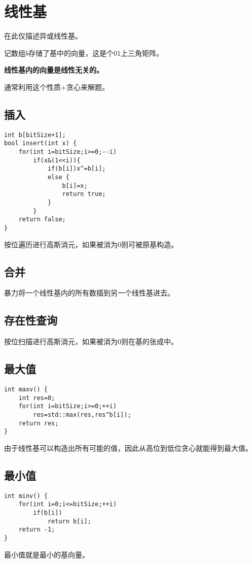 \section{线性基}
在此仅描述异或线性基。

记数组$b$存储了基中的向量，这是个01上三角矩阵。

\begin{property}
    {\bfseries 线性基内的向量是线性无关的。}
\end{property}
通常利用这个性质+贪心来解题。
\subsection{插入}
\begin{lstlisting}
int b[bitSize+1];
bool insert(int x) {
    for(int i=bitSize;i>=0;--i)
        if(x&(1<<i)){
            if(b[i])x^=b[i];
            else {
                b[i]=x;
                return true;
            }
        }
    return false;
}
\end{lstlisting}
按位遍历进行高斯消元，如果被消为0则可被原基构造。
\subsection{合并}
暴力将一个线性基内的所有数插到另一个线性基进去。
\subsection{存在性查询}
按位扫描进行高斯消元，如果被消为0则在基的张成中。
\subsection{最大值}
\begin{lstlisting}
int maxv() {
    int res=0;
    for(int i=bitSize;i>=0;++i)
        res=std::max(res,res^b[i]);
    return res;
}
\end{lstlisting}
由于线性基可以构造出所有可能的值，因此从高位到低位贪心就能得到最大值。
\subsection{最小值}
\begin{lstlisting}
int minv() {
    for(int i=0;i<=bitSize;++i)
        if(b[i])
            return b[i];
    return -1;
}
\end{lstlisting}
最小值就是最小的基向量。
